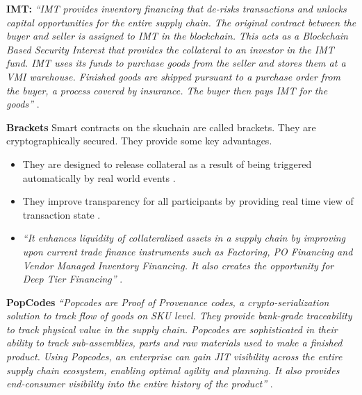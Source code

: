 \textbf{IMT:}
\textit{“IMT provides inventory financing that de-risks transactions and unlocks capital opportunities for the entire supply chain. The original contract between the buyer and seller is assigned to IMT in the blockchain. This acts as a Blockchain Based Security Interest that provides the collateral to an investor in the IMT fund. IMT uses its funds to purchase goods from the seller and stores them at a VMI warehouse. Finished goods are shipped pursuant to a purchase order from the buyer, a process covered by insurance. The buyer then pays IMT for the goods”} \cite{misc:015}.

\textbf{Brackets}
Smart contracts on the skuchain are called brackets. They are cryptographically secured. They provide some key advantages. 

\begin{itemize}

\item They are designed to release collateral as a result of being triggered automatically by real world events \cite{misc:015}. 
\item  They improve transparency for all participants by providing real time view of transaction state \cite{misc:015}. 
\item  \textit{“It enhances liquidity of collateralized assets in a supply chain by improving upon current trade finance instruments such as Factoring, PO Financing and Vendor Managed Inventory Financing. It also creates the opportunity for Deep Tier Financing”} \cite{misc:015}. 
\end{itemize}

\textbf{PopCodes}
\textit{“Popcodes are Proof of Provenance codes, a crypto-serialization solution to track flow of goods on SKU level. They provide bank-grade traceability to track physical value in the supply chain. Popcodes are sophisticated in their ability to track sub-assemblies, parts and raw materials used to make a finished product. Using Popcodes, an enterprise can gain JIT visibility across the entire supply chain ecosystem, enabling optimal agility and planning. It also provides end-consumer visibility into the entire history of the product”} \cite{misc:015}.

